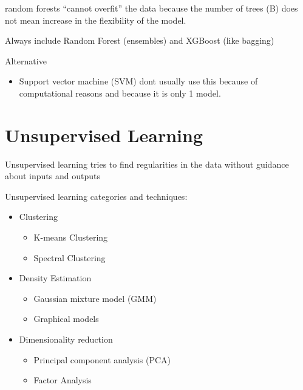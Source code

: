 \documentclass[
]{book}
\providecommand{\tightlist}{%
  \setlength{\itemsep}{0pt}\setlength{\parskip}{0pt}}
\begin{document}
random forests ``cannot overfit'' the data because the number of trees (B) does not mean increase in the flexibility of the model.

Always include Random Forest (ensembles) and XGBoost (like bagging)

Alternative

\begin{itemize}
\tightlist
\item
  Support vector machine (SVM) dont usually use this because of computational reasons and because it is only 1 model.
\end{itemize}

\hypertarget{unsupervised-learning}{%
\chapter{Unsupervised Learning}\label{unsupervised-learning}}

Unsupervised learning tries to find regularities in the data without guidance about inputs and outputs

Unsupervised learning categories and techniques:

\begin{itemize}
\item
  Clustering

  \begin{itemize}
  \tightlist
  \item
    K-means Clustering\\
  \item
    Spectral Clustering\\
  \end{itemize}
\item
  Density Estimation

  \begin{itemize}
  \tightlist
  \item
    Gaussian mixture model (GMM)\\
  \item
    Graphical models\\
  \end{itemize}
\item
  Dimensionality reduction

  \begin{itemize}
  \tightlist
  \item
    Principal component analysis (PCA)\\
  \item
    Factor Analysis
  \end{itemize}
\end{itemize}
\end{document}
